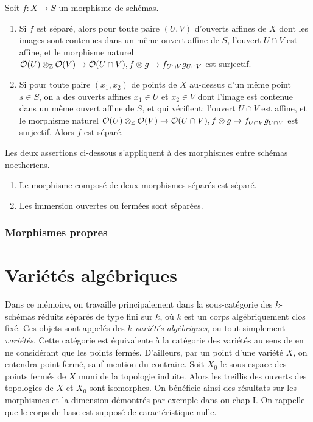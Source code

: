 \begin{prop}\label{sepCritere}
Soit $f:X\rightarrow S$ un morphisme de schémas.
	\begin{enumerate}
	\item Si $f$ est séparé, alors pour toute paire $(U,V)$ d'ouverts affines de $X$ dont les images sont contenues dans un même ouvert affine de $S$, l'ouvert $U\cap V$ est affine, et le morphisme naturel $\mathcal{O}(U)\otimes_{\mathbb{Z}} \mathcal{O}(V)\rightarrow\mathcal{O}(U\cap V), f\otimes g\mapsto f_{U\cap V}g_{U\cap V}$ est surjectif.
	\item Si pour toute paire $(x_1,x_2)$ de points de $X$ au-dessus d'un même point $s\in S$, on a des ouverts affines $x_1\in U$ et $x_2\in V$ dont l'image est contenue dans un même ouvert affine de $S$, et qui vérifient: l'ouvert $U\cap V$ est affine, et le morphisme naturel $\mathcal{O}(U)\otimes_{\mathbb{Z}} \mathcal{O}(V)\rightarrow\mathcal{O}(U\cap V), f\otimes g\mapsto f_{U\cap V}g_{U\cap V}$ est surjectif. Alors $f$ est séparé.
	\end{enumerate}
\end{prop}


\begin{prop}\label{sepCritere2}
Les deux assertions ci-dessous s'appliquent à des morphismes entre schémas noetheriens.
\begin{enumerate}
	\item Le morphisme composé de deux morphismes séparés est séparé.
	\item Les immersion ouvertes ou fermées sont séparées.
	\end{enumerate}
\end{prop}


\subsubsection{Morphismes propres}


\section{Variétés algébriques}

Dans ce mémoire, on travaille principalement dans la sous-catégorie des $k$-schémas réduits séparés de type fini sur $k$, où $k$ est un corps algébriquement clos fixé. Ces objets sont appelés des \textit{$k$-variétés algèbriques}, ou tout simplement \textit{variétés}.  Cette catégorie est équivalente à la catégorie des variétés au sens de \cite{LAGSpringer} en ne considérant que les points fermés. D'ailleurs, par un point d'une variété $X$, on entendra point fermé, sauf mention du contraire. Soit $X_0$ le sous espace des points fermés de $X$ muni de la topologie induite. Alors les treillis des ouverts des topologies de $X$ et $X_0$ sont isomorphes. On bénéficie ainsi des résultats sur les morphismes et la dimension démontrés par exemple dans \cite{LAGSpringer} ou \cite{MumfordRedBook} chap I. On rappelle que le corps de base est supposé de caractéristique nulle.

